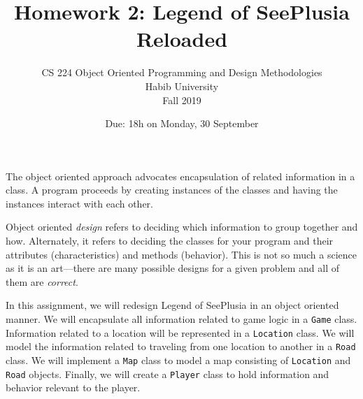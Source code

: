 \documentclass[addpoints]{exam}
\title{Homework 2: Legend of SeePlusia Reloaded}
\author{CS 224 Object Oriented Programming and Design Methodologies\\Habib University\\Fall 2019}
\date{Due: 18h on Monday, 30 September}
\begin{document}
\maketitle

The object oriented approach advocates encapsulation of related information in a class. A program proceeds by creating instances of the classes and having the instances interact with each other.

Object oriented {\it design} refers to deciding which information to group together and how. Alternately, it refers to deciding the classes for your program and their attributes (characteristics) and methods (behavior). This is not so much a science as it is an art---there are many possible designs for a given problem and all of them are {\it correct}.

In this assignment, we will redesign Legend of SeePlusia in an object oriented manner. We will encapsulate all information related to game logic in a {\tt Game} class. Information related to a location will be represented in a {\tt Location} class. We will model the information related to traveling from one location to another in a {\tt Road} class. We will implement a {\tt Map} class to model a map consisting of {\tt Location} and {\tt Road} objects. Finally, we will create a {\tt Player} class to hold information and behavior relevant to the player.
\end{document}

